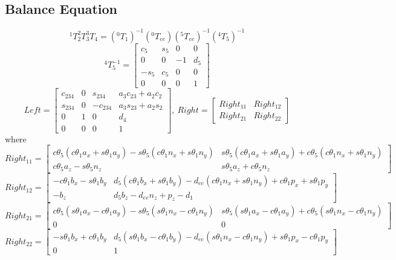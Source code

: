 \documentclass[utf8]{article}
\begin{document}
\subsection{Balance Equation}
$$ ^1T_2^2T_3^3T_4 = (^0T_1)^{-1}(^0T_{ee})(^5T_{ee})^{-1}(^4T_5)^{-1}$$
\begin{equation}
^4T_5^{-1} = \left[
\begin{matrix}
c_5 & s_5 & 0 & 0\\
0 & 0 & -1 & d_5\\
-s_5 & c_5 & 0 & 0\\
0 & 0 & 0 & 1
\end{matrix}
\right]
\end{equation}
\begin{equation}\label{1T4}
Left = \left[
\begin{matrix}
c_{234} & 0 & s_{234} & a_3c_{23}+a_2c_2\\
s_{234} & 0 & -c_{234} & a_3s_{23}+a_2s_2\\
0 & 1 & 0 & d_4\\
0 & 0 & 0 & 1
\end{matrix}
\right],\ Right = \left[
\begin{matrix}
Right_{11} & Right_{12} \\
Right_{21} & Right_{22} 
\end{matrix}
\right]
\end{equation}
where
$$Right_{11} = \left[
\begin{matrix}
c\theta_5(c\theta_1a_x +s\theta_1a_y) - s\theta_5(c\theta_1n_x + s\theta_1n_y) & s\theta_5(c\theta_1a_x +s\theta_1a_y) + c\theta_5(c\theta_1n_x + s\theta_1n_y) \\
c\theta_5a_z - s\theta_5n_z & s\theta_5a_z + c\theta_5n_z
\end{matrix}
\right]$$
$$Right_{12} = \left[
\begin{matrix}
-c\theta_1b_x - s\theta_1b_y & d_5(c\theta_1b_x + s\theta_1b_y) - d_{ee}(c\theta_1n_x + s\theta_1n_y) + c\theta_1p_x + s\theta_1p_y\\
-b_z & d_5b_z - d_{ee}n_z + p_z - d_1
\end{matrix}
\right]$$
$$Right_{21} = \left[
\begin{matrix}
c\theta_5(s\theta_1a_x - c\theta_1a_y) - s\theta_5(s\theta_1n_x - c\theta_1n_y) & s\theta_5(s\theta_1a_x - c\theta_1a_y) + c\theta_5(s\theta_1n_x - c\theta_1n_y)\\
0 & 0
\end{matrix}
\right]$$
$$Right_{22} = \left[
\begin{matrix}
-s\theta_1b_x + c\theta_1b_y & d_5(s\theta_1b_x - c\theta_1b_y) - d_{ee}(s\theta_1n_x - c\theta_1n_y) + s\theta_1p_x - c\theta_1p_y\\
0 & 1
\end{matrix}
\right]$$
\end{document}
